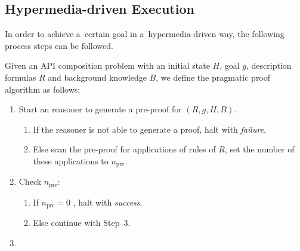 \subsection{Hypermedia-driven Execution}
\label{subsec:Execution}
In order to achieve a~certain goal in a~hypermedia-driven way,
the following process steps can be followed.
\begin{definition}
\label{def:PPAlgorithm}
Given an API composition problem with an initial state $H$, goal $g$,
description formulas $R$ and background knowledge $B$,
we define the pragmatic proof algorithm as follows:
\begin{enumerate}
\item
  Start an \nthree reasoner to generate a pre-proof for $(R, g, H, B)$. %
  \begin{enumerate}
  \item If the reasoner is not able to generate a proof, halt with \emph{failure}.
  \item Else scan the pre-proof for applications of rules of $R$, set the number of these applications to $n_{\text{pre}}$.
  \end{enumerate} 
  \item Check $n_{\text{pre}}$:
  \begin{enumerate}
  \item If $n_{\text{pre}}=0$%
  , halt with \emph{success}.
  \item Else %
  continue with Step~3.
  \end{enumerate}
%   
\item

\end{enumerate}
\end{definition}

